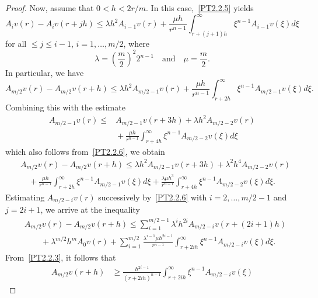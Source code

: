 \documentclass[11pt]{amsart}
\theoremstyle{definition}
\numberwithin{equation}{section}
\begin{document}
\begin{proof}
Now, assume that $0 < h < 2 r / m$. In this case,~\eqref{PT2.2.5} yields
\begin{equation}
	A_i v (r) - A_i v (r + j h)
	\le
	\lambda
	h^2
	A_{i - 1} v (r)
	+
	\frac{
		\mu h
	}{
		r^{n - 1}
	}
	\int_{r + (j + 1) h}^\infty
	\xi^{n - 1}
	A_{i-1} v (\xi)
	d\xi
	\label{PT2.2.6}
\end{equation}
for all $ \le j \le i - 1$, $i = 1, \ldots, m / 2$,
where
$$
	\lambda
	=
	\left(
		\frac{m}{2}
	\right)^2
	2^{n - 1}
	\quad
	\mbox{and}
	\quad
	\mu
	=
	\frac{m}{2}.
$$
In particular, we have
$$
	A_{m / 2} v (r) - A_{m / 2} v (r + h)
	\le
	\lambda
	h^2
	A_{m / 2 - 1} v (r)
	+
	\frac{
		\mu h
	}{
		r^{n - 1}
	}
	\int_{r + 2 h}^\infty
	\xi^{n - 1}
	A_{m / 2 - 1} v (\xi)
	d\xi.
$$
Combining this with the estimate
\begin{align*}
	A_{m / 2 - 1} v (r) 
	\le
	{}
	& 
	A_{m / 2 - 1} v (r + 3 h)
	+
	\lambda
	h^2
	A_{m / 2 - 2} v (r)
	\\
	&
	{}
	+
	\frac{
		\mu h
	}{
		r^{n - 1}
	}
	\int_{r + 4 h}^\infty
	\xi^{n - 1}
	A_{m / 2 - 2} v (\xi)
	d\xi
\end{align*}
which also follows from~\eqref{PT2.2.6}, we obtain
\begin{align*}
	&
	A_{m / 2} v (r) - A_{m / 2} v (r + h)
	\le
	\lambda
	h^2
	A_{m / 2 - 1} v (r + 3 h)
	+
	\lambda^2
	h^4
	A_{m / 2 - 2} v (r)
	\\
	&
	\quad
	{}
	+
	\frac{
		\mu h
	}{
		r^{n - 1}
	}
	\int_{r + 2 h}^\infty
	\xi^{n - 1}
	A_{m / 2 - 1} v (\xi)
	d\xi
	+
	\frac{
		\lambda 
		\mu 
		h^3
	}{
		r^{n - 1}
	}
	\int_{r + 4 h}^\infty
	\xi^{n - 1}
	A_{m / 2 - 2} v (\xi)
	d\xi.
\end{align*}
Estimating $A_{m / 2 - i} v (r)$ successively by~\eqref{PT2.2.6} with $i = 2, \ldots, m / 2 - 1$ and $j = 2 i + 1$, we arrive at the inequality
\begin{align}
	&
	A_{m / 2} v (r) - A_{m / 2} v (r + h)
	\le
	\sum_{i = 1}^{m / 2 - 1}
	\lambda^i h^{2 i}
	A_{m / 2 - i} v (r + (2 i + 1) h)
	\label{PT2.2.7}
	\\
	&
	\qquad
	{}
	+
	\lambda^{m / 2}
	h^m
	A_0 v (r)
	+
	\sum_{i = 1}^{m / 2}
	\frac{
		\lambda^{i - 1}
		\mu
		h^{2 i - 1}
	}{
		r^{n - 1}
	}
	\int_{r + 2 i h}^\infty
	\xi^{n - 1}
	A_{m / 2 - i} v (\xi)
	d\xi.
	\nonumber
\end{align}
From~\eqref{PT2.2.3}, it follows that
\begin{align*}
	A_{m / 2} v (r + h)
	&
	{}
	\ge
	\frac{
		h^{2 i - 1}
	}{
		(r + 2 i h)^{n - 1}
	}
	\int_{r + 2 i h}^\infty
	\xi^{n - 1}
	A_{m / 2 - i} v (\xi)

\end{align*}
\end{proof}
\end{document}
